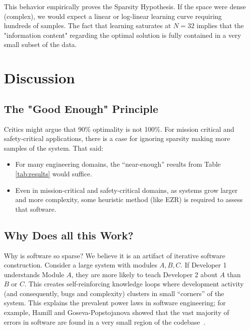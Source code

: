 \documentclass[runningheads]{llncs}
\begin{document}
This behavior empirically proves the Sparsity Hypothesis. If the space were 
dense (complex), we would expect a linear or log-linear learning curve 
requiring hundreds of samples. The fact that learning saturates at $N=32$ 
implies that the "information content" regarding the optimal solution is 
fully contained in a very small subset of the data.



\section{Discussion}
\subsection{The "Good Enough" Principle}
Critics might argue that 90\% optimality is not 100\%. For mission critical and safety-critical applications, there is a case for ignoring  sparsity making more samples of the system.
That said:
\begin{itemize}
\item For many engineering domains, the ``near-enough'' results from Table \ref{tab:results} would suffice.
\item Even in mission-critical and safety-critical domains, as   systems grow larger and more complexity, some heuristic method  (like EZR) is required to assess that software.    
\end{itemize}
 


\subsection{Why Does all this Work?}
Why is software so sparse? We believe it is an artifact of iterative 
software construction. 
Consider a large system with modules $A, B, C$. If Developer 1 understands
Module $A$, they are more likely to teach Developer 2 about $A$ than $B$ or
$C$. This creates self-reinforcing knowledge loops where development activity
(and consequently, bugs and complexity) clusters in small ``corners'' of the
system. This explains the prevalent power laws in software engineering; for
example, Hamill and Goseva-Popstojanova showed that the vast majority of errors
in software are found in a very small region of the codebase~\cite{Hamill09}.
 
\end{document}
